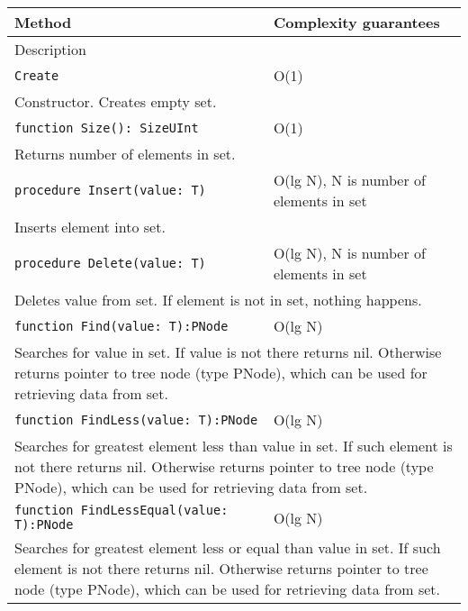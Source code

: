 \begin{longtable}{|m{10cm}|m{5cm}|}
\hline
Method & Complexity guarantees \\ \hline
\multicolumn{2}{|m{15cm}|}{Description} \\ \hline\hline

\verb!Create! & O(1) \\ \hline
\multicolumn{2}{|m{15cm}|}{Constructor. Creates empty set.} \\ \hline\hline

\verb!function Size(): SizeUInt! & O(1) \\ \hline
\multicolumn{2}{|m{15cm}|}{Returns number of elements in set.} \\\hline\hline

\verb!procedure Insert(value: T)! &
O(lg N), N is number of elements in set \\ \hline
\multicolumn{2}{|m{15cm}|}{Inserts element into set.} \\\hline\hline

\verb!procedure Delete(value: T)! &
O(lg N), N is number of elements in set \\ \hline
\multicolumn{2}{|m{15cm}|}{Deletes value from set. If element is not in set, nothing happens.} \\\hline\hline

\verb!function Find(value: T):PNode! & O(lg N) \\\hline
\multicolumn{2}{|m{15cm}|}{Searches for value in set. If value is not there returns nil. Otherwise
returns pointer to tree node (type PNode), which can be used for retrieving data from set.} \\\hline\hline

\verb!function FindLess(value: T):PNode! & O(lg N) \\\hline
\multicolumn{2}{|m{15cm}|}{Searches for greatest element less than value in set. If such element is not there returns nil. Otherwise
returns pointer to tree node (type PNode), which can be used for retrieving data from set.} \\\hline\hline

\verb!function FindLessEqual(value: T):PNode! & O(lg N) \\\hline
\multicolumn{2}{|m{15cm}|}{Searches for greatest element less or equal than value in set. If such element is not there returns nil. Otherwise
returns pointer to tree node (type PNode), which can be used for retrieving data from set.} \\\hline\hline


\end{longtable}
